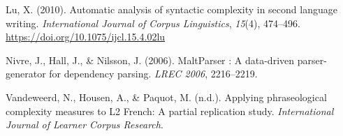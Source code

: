 \documentclass[
]{article}
\begin{document}
\leavevmode\hypertarget{ref-Lu2010}{}%
Lu, X. (2010). Automatic analysis of syntactic complexity in second
language writing. \emph{International Journal of Corpus Linguistics},
\emph{15}(4), 474--496. \url{https://doi.org/10.1075/ijcl.15.4.02lu}

\leavevmode\hypertarget{ref-Nivre2006}{}%
Nivre, J., Hall, J., \& Nilsson, J. (2006). MaltParser : A data-driven
parser-generator for dependency parsing. \emph{LREC 2006}, 2216--2219.

\leavevmode\hypertarget{ref-Vandeweerd2021b}{}%
Vandeweerd, N., Housen, A., \& Paquot, M. (n.d.). Applying
phraseological complexity measures to L2 French: A partial replication
study. \emph{International Journal of Learner Corpus Research}.
\end{document}
